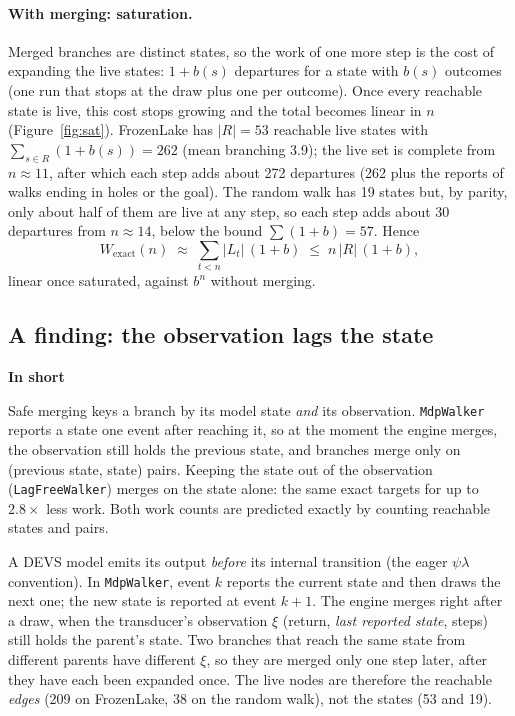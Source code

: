 \documentclass[11pt]{article}
\newcommand{\code}[1]{\texttt{#1}}
\newcommand{\shadedbox}[3]{\par\smallskip\noindent\colorbox{#1}{\parbox{\dimexpr\linewidth-2\fboxsep}{\textbf{#2}\par #3}}\par\smallskip}
\newcommand{\takeaway}[1]{\shadedbox{okbg}{In short}{#1}}
\begin{document}
\paragraph{With merging: saturation.} Merged branches are distinct states, so the work of one more step is the cost of
expanding the live states: $1+b(s)$ departures for a state with $b(s)$ outcomes (one run that stops at the draw plus one
per outcome). Once every reachable state is live, this cost stops growing and the total becomes linear in $n$
(Figure~\ref{fig:sat}). FrozenLake has $|R|=53$ reachable live states with $\sum_{s\in R}(1+b(s))=262$ (mean branching
3.9); the live set is complete from $n\approx11$, after which each step adds about 272 departures (262 plus the
reports of walks ending in holes or the goal). The random walk has 19 states but, by parity, only about half of them are
live at any step, so each step adds about 30 departures from $n\approx14$, below the bound $\sum(1+b)=57$. Hence
\[
W_{\text{exact}}(n)\;\approx\;\sum_{t<n}|L_t|\,(1+b)\;\le\; n\,|R|\,(1+b),
\]
linear once saturated, against $b^n$ without merging.

\subsection{A finding: the observation lags the state}\label{sec:lag}

\takeaway{Safe merging keys a branch by its model state \emph{and} its observation. \code{MdpWalker} reports a state
one event after reaching it, so at the moment the engine merges, the observation still holds the previous state, and
branches merge only on (previous state, state) pairs. Keeping the state out of the observation (\code{LagFreeWalker})
merges on the state alone: the same exact targets for up to $2.8\times$ less work. Both work counts are predicted
exactly by counting reachable states and pairs.}

A DEVS model emits its output \emph{before} its internal transition (the eager $\psi\lambda$ convention). In
\code{MdpWalker}, event $k$ reports the current state and then draws the next one; the new state is reported at
event $k+1$. The engine merges right after a draw, when the transducer's observation $\xi$ (return, \emph{last
reported state}, steps) still holds the parent's state. Two branches that reach the same state from different parents
have different $\xi$, so they are merged only one step later, after they have each been expanded once. The live nodes
are therefore the reachable \emph{edges} (209 on FrozenLake, 38 on the random walk), not the states (53 and 19).
\end{document}
